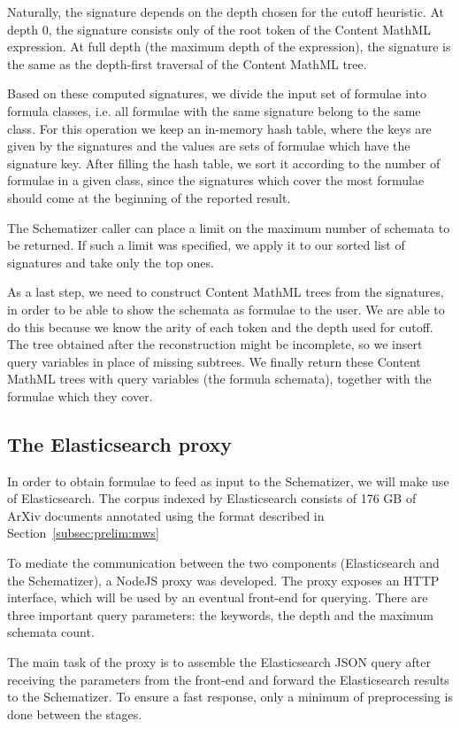 \documentclass[a4paper,11pt,oneside]{article}
\def\cmml{\textsf{Content MathML}\xspace}
\def\arxiv{\textsf{ArXiv}\xspace}
\begin{document}
Naturally, the signature depends on the depth chosen for the cutoff heuristic.
At depth 0, the signature consists only of the root token of the \cmml
expression. At full depth (the maximum depth of the expression), the signature
is the same as the depth-first traversal of the \cmml tree.

Based on these computed signatures, we divide the input set of formulae into
formula classes, i.e. all formulae with the same signature belong to the same
class. For this operation we keep an in-memory hash table, where the keys are
given by the signatures and the values are sets of formulae which have the
signature key. After filling the hash table, we sort it according to the number
of formulae in a given class, since the signatures which cover the most
formulae should come at the beginning of the reported result.

The Schematizer caller can place a limit on the maximum number of schemata to be
returned. If such a limit was specified, we apply it to our sorted list of
signatures and take only the top ones.

As a last step, we need to construct \cmml trees from the signatures, in order
to be able to show the schemata as formulae to the user. We are able to do
this because we know the arity of each token and the depth used for cutoff.
The tree obtained after the reconstruction might be incomplete, so we insert
query variables in place of missing subtrees.
We finally return these \cmml trees with query variables (the formula
schemata), together with the formulae which they cover.

\subsection{The Elasticsearch proxy}\label{subsec:esproxy}
In order to obtain formulae to feed as input to the Schematizer, we will make
use of Elasticsearch. The corpus indexed by Elasticsearch consists of 176 GB of
\arxiv documents annotated using the format described in
Section~\ref{subsec:prelim:mws}

To mediate the communication between the two components (Elasticsearch and the
Schematizer), a NodeJS proxy was developed. The proxy exposes an HTTP
interface, which will be used by an eventual front-end for querying.
There are three important query parameters: the keywords, the depth and the
maximum schemata count.

The main task of the proxy is to assemble the Elasticsearch JSON query after
receiving the parameters from the front-end and forward the Elasticsearch
results to the Schematizer. To ensure a fast response, only a minimum of
preprocessing is done between the stages.
\end{document}
